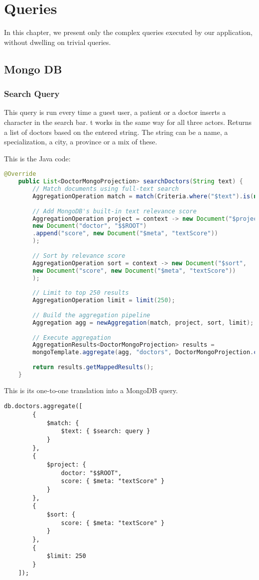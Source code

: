 \chapter{Queries}
In this chapter, we present only the complex queries executed by our application, without dwelling on trivial queries. 

\section{Mongo DB}
\subsection{Search Query}
This query is run every time a guest user, a patient or a doctor inserts a character in the search bar. t works in the same way for all three actors. Returns a list of doctors based on the entered string. The string can be a name, a specialization, a city, a province or a mix of these. 

This is the Java code:
\begin{lstlisting}[language=java]
	@Override
	public List<DoctorMongoProjection> searchDoctors(String text) {
		// Match documents using full-text search
		AggregationOperation match = match(Criteria.where("$text").is(new Document("$search", text)));
		
		// Add MongoDB's built-in text relevance score
		AggregationOperation project = context -> new Document("$project",
		new Document("doctor", "$$ROOT")
		.append("score", new Document("$meta", "textScore"))
		);
		
		// Sort by relevance score
		AggregationOperation sort = context -> new Document("$sort",
		new Document("score", new Document("$meta", "textScore"))
		);
		
		// Limit to top 250 results
		AggregationOperation limit = limit(250);
		
		// Build the aggregation pipeline
		Aggregation agg = newAggregation(match, project, sort, limit);
		
		// Execute aggregation
		AggregationResults<DoctorMongoProjection> results =
		mongoTemplate.aggregate(agg, "doctors", DoctorMongoProjection.class);
		
		return results.getMappedResults();
	}
\end{lstlisting}

This is its one-to-one translation into a MongoDB query. 
\begin{lstlisting}[language=mongodb]
	db.doctors.aggregate([
		{
			$match: {
				$text: { $search: query }
			}
		},
		{
			$project: {
				doctor: "$$ROOT",
				score: { $meta: "textScore" }
			}
		},
		{
			$sort: {
				score: { $meta: "textScore" }
			}
		},
		{
			$limit: 250
		}
	]);
\end{lstlisting}

